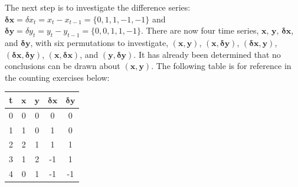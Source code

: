 \documentclass[a4paper,11pt]{article}
\begin{document}
The next step is to investigate the difference series: $\mathbf{\delta x} = \delta x_t = x_t - x_{t-1} = \{0,1,1,-1,-1\}$ and $\mathbf{\delta y} =\delta y_t = y_t - y_{t-1} = \{0,0,1,1,-1\}$.  There are now four time series, $\mathbf{x}$, $\mathbf{y}$, $\mathbf{\delta x}$, and $\mathbf{\delta y}$, with six permutations to investigate, $(\mathbf{x},\mathbf{y})$, $(\mathbf{x},\mathbf{\delta y})$, $(\mathbf{\delta x},\mathbf{y})$, $(\mathbf{\delta x},\mathbf{\delta y})$, $(\mathbf{x},\mathbf{\delta x})$, and $(\mathbf{y},\mathbf{\delta y})$.  It has already been determined that no conclusions can be drawn about $(\mathbf{x},\mathbf{y})$.  The following table is for reference in the counting exercises below:
\begin{center}
\begin{tabular}{c|c|c|c|c}
t & $\mathbf{x}$ & $\mathbf{y}$ & $\mathbf{\delta x}$ & $\mathbf{\delta y}$ \\
\hline 
0 & 0 & 0 & 0 & 0\\
1 & 1 & 0 & 1 & 0\\
2 & 2 & 1 & 1 & 1\\
3 & 1 & 2 & -1 & 1\\
4 & 0 & 1 & -1 & -1
\end{tabular}
\end{center}
\end{document}
